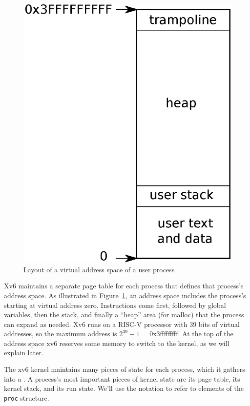 \begin{figure}[t]
\center
\includegraphics[scale=0.5]{fig/as.eps}
\caption{Layout of a virtual address space of a user process}
\label{fig:as}
\end{figure}

Xv6 maintains a separate page table for each process that defines that process's
address space.  As illustrated in 
Figure~\ref{fig:as},
an address space includes the process's
starting at virtual address zero. Instructions come first,
followed by global variables, then the stack,
and finally a ``heap'' area (for malloc)
that the process can expand as needed.
Xv6 runs on a RISC-V processor with 39 bits of virtual addresses,
so the maximum address is $2^{39}-1$ = 0x3fffffffff.
At the top of the address space xv6 reserves some
memory to switch to the kernel, as we will explain later.

The xv6 kernel maintains many pieces of state for each process,
which it gathers into a
.
A process's most important pieces of kernel state are its 
page table, its kernel stack, and its run state.
We'll use the notation
to refer to elements of the
\lstinline{proc}
structure.

